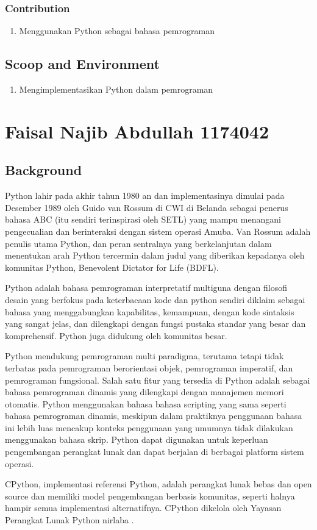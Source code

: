 \subsubsection{Contribution}
\begin{enumerate}
\item Menggunakan Python sebagai bahasa pemrograman
\end{enumerate}
\subsection{Scoop and Environment}
\begin{enumerate}
\item Mengimplementasikan Python dalam pemrograman
\end{enumerate}


\section{Faisal Najib Abdullah 1174042}
\subsection{Background}
\label{Background}
\par
Python lahir pada akhir tahun 1980 an dan implementasinya dimulai pada Desember 1989 oleh Guido van Rossum di CWI di Belanda sebagai penerus bahasa ABC (itu sendiri terinspirasi oleh SETL) yang mampu menangani pengecualian dan berinteraksi dengan sistem operasi Amuba. Van Rossum adalah penulis utama Python, dan peran sentralnya yang berkelanjutan dalam menentukan arah Python tercermin dalam judul yang diberikan kepadanya oleh komunitas Python, Benevolent Dictator for Life (BDFL).
\par
Python adalah bahasa pemrograman interpretatif multiguna dengan filosofi desain yang berfokus pada keterbacaan kode dan python sendiri diklaim sebagai bahasa yang menggabungkan kapabilitas, kemampuan, dengan kode sintaksis yang sangat jelas, dan dilengkapi dengan fungsi pustaka standar yang besar dan komprehensif. Python juga didukung oleh komunitas besar.
\par
Python mendukung pemrograman multi paradigma, terutama tetapi tidak terbatas pada pemrograman berorientasi objek, pemrograman imperatif, dan pemrograman fungsional. Salah satu fitur yang tersedia di Python adalah sebagai bahasa pemrograman dinamis yang dilengkapi dengan manajemen memori otomatis. Python menggunakan bahasa bahasa scripting yang sama seperti bahasa pemrograman dinamis, meskipun dalam praktiknya penggunaan bahasa ini lebih luas mencakup konteks penggunaan yang umumnya tidak dilakukan menggunakan bahasa skrip. Python dapat digunakan untuk keperluan pengembangan perangkat lunak dan dapat berjalan di berbagai platform sistem operasi.
\par
CPython, implementasi referensi Python, adalah perangkat lunak bebas dan open source dan memiliki model pengembangan berbasis komunitas, seperti halnya hampir semua implementasi alternatifnya. CPython dikelola oleh Yayasan Perangkat Lunak Python nirlaba \cite{van2007python}.


